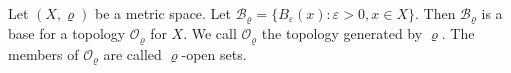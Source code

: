 Let $(X, \varrho)$ be a metric space. Let $\mathcal{B}_{\varrho} = \{B_{\varepsilon}(x) : \varepsilon > 0, x \in X\}$. Then $\mathcal{B}_{\varrho}$ is a base for a topology $\mathcal{O}_{\varrho}$ for $X$. We call $\mathcal{O}_{\varrho}$ the topology generated by $\varrho$. The members of $\mathcal{O}_{\varrho}$ are called $\varrho$-open sets.